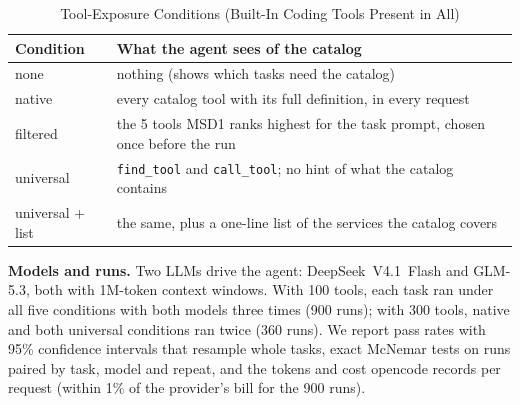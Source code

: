 \documentclass[conference]{IEEEtran}
\newcommand{\msd}{MSD1}
\begin{document}
\begin{table}[t]
\caption{Tool-Exposure Conditions (Built-In Coding Tools Present in All)}
\label{tab:hconditions}
\centering\footnotesize
\begin{tabularx}{\columnwidth}{@{}l X@{}}
\toprule
Condition & What the agent sees of the catalog \\
\midrule
none & nothing (shows which tasks need the catalog) \\
native & every catalog tool with its full definition, in every request \\
filtered & the 5 tools \msd{} ranks highest for the task prompt, chosen once before the run \\
universal & \texttt{find\_tool} and \texttt{call\_tool}; no hint of what the catalog contains \\
universal + list & the same, plus a one-line list of the services the catalog covers \\
\bottomrule
\end{tabularx}
\end{table}

\textbf{Models and runs.} Two LLMs drive the agent: DeepSeek~V4.1~Flash and GLM-5.3, both with 1M-token context
windows. With 100 tools, each task ran under all five conditions with both models three times (900 runs); with
300 tools, native and both universal conditions ran twice (360 runs). We report pass rates with 95\%
confidence intervals that resample whole tasks, exact McNemar tests on runs paired by task, model and repeat,
and the tokens and cost opencode records per request (within 1\% of the provider's bill for the 900 runs).

\end{document}

